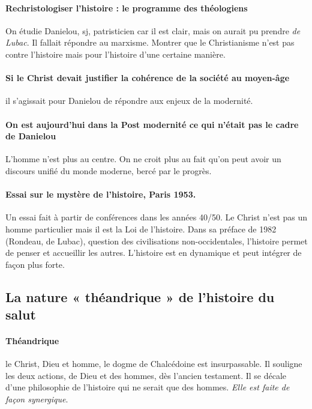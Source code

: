 \paragraph{Rechristologiser l'histoire : le programme des théologiens} On étudie Danielou, sj, patristicien car il est clair, mais on aurait pu prendre \textit{de Lubac}. Il fallait répondre au marxisme. Montrer que le Christianisme n'est pas contre l'histoire mais pour l'histoire d'une certaine manière.

\paragraph{Si le Christ devait justifier la cohérence de la société au moyen-âge} il s'agissait pour Danielou de répondre aux enjeux de la modernité.

\paragraph{On est aujourd'hui dans la Post modernité ce qui n'était pas le cadre de Danielou} L'homme n'est plus au centre. On ne croit plus au fait qu'on peut avoir un discours unifié du monde moderne, bercé par le progrès.

\paragraph{
Essai sur le mystère de l’histoire, Paris 1953. 
} Un essai fait à partir de conférences dans les années 40/50. Le Christ n'est pas un homme particulier mais il est la Loi de l'histoire.
Dans sa préface de 1982 (Rondeau, de Lubac), question des civilisations non-occidentales, l'histoire permet de penser et accueillir les autres. L'histoire est en dynamique et peut intégrer de façon plus forte.

\subsection{La nature « théandrique » de l’histoire du salut }

\paragraph{Théandrique} le Christ, Dieu et homme, le dogme de Chalcédoine est insurpassable. Il souligne les deux actions, de Dieu et des hommes, dès l'ancien testament. Il se décale d'une philosophie de l'histoire qui ne serait que des hommes. \textit{Elle est faite de façon synergique}.



